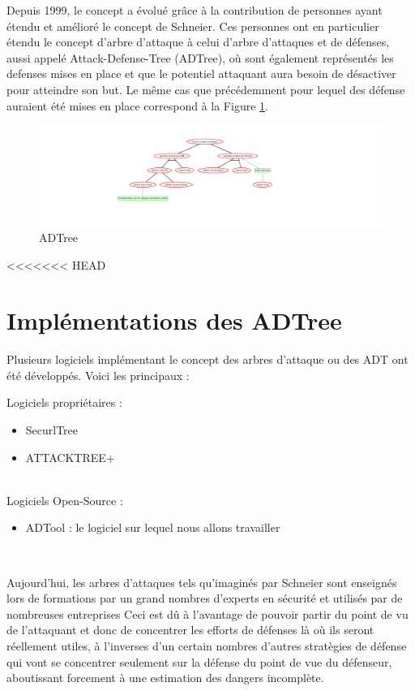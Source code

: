 		Depuis 1999, le concept a évolué grâce à la contribution de personnes ayant étendu et amélioré le concept de Schneier. Ces personnes ont en particulier étendu le concept d'arbre d'attaque à celui d'arbre d'attaques et de défenses, aussi appelé Attack-Defense-Tree (ADTree), où sont également représentés les defenses mises en place et que le potentiel attaquant aura besoin de désactiver pour atteindre son but. Le même cas que précédemment pour lequel des défense auraient été mises en place correspond à la Figure \ref{fig:arbre_exemple_2}.

        \begin{figure}[h!]
            \begin{center}
                \includegraphics[width=1\textwidth]{figure/exemple2_rapport.png}
            \end{center}
            \caption{ADTree}
            \label{fig:arbre_exemple_2}
        \end{figure}

<<<<<<< HEAD
	\section{Implémentations des ADTree}
		Plusieurs logiciels implémentant le concept des arbres d'attaque ou des ADT ont été développés. Voici les principaux :
        
        {\large Logiciels propriétaires :}
        \begin{itemize}
            \item SecurlTree
            \item ATTACKTREE+
        \end{itemize}
        ~~\\
        {\large Logiciels Open-Source :}
        \begin{itemize}
            \item ADTool : le logiciel sur lequel nous allons travailler
        \end{itemize}
~~

        Aujourd'hui, les arbres d'attaques tels qu'imaginés par Schneier sont enseignés lors de formations par un grand nombres d'experts en sécurité et utilisés par de nombreuses entreprises Ceci est dû à l'avantage de pouvoir partir du point de vu de l'attaquant et donc de concentrer les efforts de défenses là où ils seront réellement utiles, à l'inverses d'un certain nombres d'autres stratègies de défense qui vont se concentrer seulement sur la défense du point de vue du défenseur, aboutissant forcement à une estimation des dangers incomplète. 

